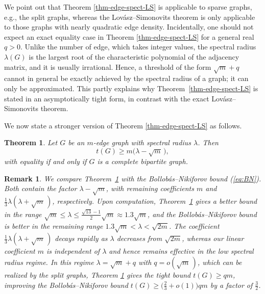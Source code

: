 \documentclass[10pt,a4paper]{amsart}
\newtheorem{theorem}{Theorem}[section]
\newtheorem{remark}{Remark}
\renewcommand{\le}{\leqslant}
\renewcommand{\geq}{\geqslant}
\renewcommand{\ge}{\geqslant}
\begin{document}
  We point out that Theorem \ref{thm-edge-spect-LS} is applicable to sparse graphs, e.g., the split graphs, whereas the Lov\'{a}sz--Simonovits theorem is only applicable to those graphs with nearly quadratic edge density.  
Incidentally, one should not expect an exact equality case in Theorem \ref{thm-edge-spect-LS} for a general real $q>0$. 
Unlike the number of edge, which takes integer values, the spectral
radius $\lambda(G)$ is the largest root of the characteristic polynomial of the adjacency matrix, and it is usually irrational. Hence, a threshold of the form $\sqrt{m}+q$ cannot in general be exactly achieved by the spectral radius of a graph; it can only be approximated. This partly explains why Theorem~\ref{thm-edge-spect-LS} is stated in an 
asymptotically tight form, in contrast with the exact Lov\'{a}sz--Simonovits theorem.  

\smallskip 
We now state a stronger version of Theorem \ref{thm-edge-spect-LS} as follows. 

\begin{theorem} \label{thm:strong}
Let $G$ be an $m$-edge graph with spectral radius $\lambda$.   
Then
\[
    t(G)\geq m\bigl(\lambda -\sqrt m\, \bigr),
\]
with equality if and only if $G$ is a complete bipartite graph. 
\end{theorem}


\begin{remark}   
We compare Theorem~\ref{thm:strong} with the Bollob\'{a}s--Nikiforov bound (\ref{eq:BN}). Both contain the factor $\lambda-\sqrt m$, 
with remaining coefficients $m$ and
$\frac13\lambda(\lambda+\sqrt m\,)$, respectively. 
Upon computation, Theorem~\ref{thm:strong} gives a better bound in the range $ \sqrt m\le \lambda\le \frac{\sqrt{13}-1}{2}\sqrt m\approx 1.3\sqrt{m}$, 
and the Bollob\'{a}s--Nikiforov bound is better in the remaining range $1.3\sqrt{m} < \lambda <  \sqrt{2m}$. 
The coefficient $\tfrac13\lambda(\lambda+\sqrt m\,)$
decays rapidly as $\lambda$ decreases from $\sqrt{2m}$, whereas our linear
coefficient $m$ is independent of $\lambda$ and hence remains effective in the
low spectral radius regime. 
In this regime $\lambda=\sqrt m+q$ with $q=o(\sqrt m\,)$, which can be realized by the split graphs,  
 Theorem \ref{thm:strong} gives the tight bound  $t(G)\ge qm$, 
improving the Bollob\'{a}s--Nikiforov bound  
$t(G)\ge \big(\frac23+o(1)\big)qm$ by a factor of $\frac{3}{2}$.  
\end{remark}
 
\end{document}
